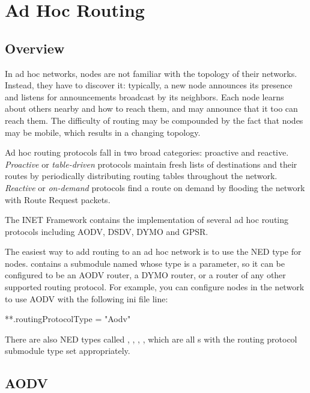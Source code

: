 \chapter{Ad Hoc Routing}
\label{cha:adhoc-routing}

\section{Overview}

In ad hoc networks, nodes are not familiar with the topology of
their networks. Instead, they have to discover it: typically,
a new node announces its presence and listens for announcements
broadcast by its neighbors. Each node learns about others nearby
and how to reach them, and may announce that it too can reach them.
The difficulty of routing may be compounded by the fact that
nodes may be mobile, which results in a changing topology.

Ad hoc routing protocols fall in two broad categories: proactive
and reactive. \textit{Proactive} or \textit{table-driven} protocols
maintain fresh lists of destinations and their routes by periodically
distributing routing tables throughout the network.
\textit{Reactive} or \textit{on-demand} protocols find a route on demand
by flooding the network with Route Request packets.

The INET Framework contains the implementation of several ad hoc routing
protocols including AODV, DSDV, DYMO and GPSR.

The easiest way to add routing to an ad hoc network is to use the
 NED type for nodes. 
contains a submodule named  whose type is a parameter,
so it can be configured to be an AODV router, a DYMO router, or a
router of any other supported routing protocol. For example, you
can configure  nodes in the network to use
AODV with the following ini file line:

\begin{inifile}
**.routingProtocolType = "Aodv"
\end{inifile}

There are also NED types called , ,
, , which are all
s with the routing protocol submodule type
set appropriately.


\section{AODV}
\label{sec:aodv}

